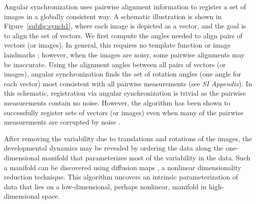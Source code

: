 \documentclass{pnastwo}
\begin{document}
\begin{article}
Angular synchronization uses pairwise alignment information to register a set of images in a globally consistent way.
%
A schematic illustration is shown in Figure~\ref{subfig:synch1}, where each image is depicted as a vector, and the goal is to align the set of vectors.
%
We first compute the angles needed to align pairs of vectors (or images).
%
In general, this requires no template function \cite{ahuja2007template} or image landmarks \cite{ian1998statistical};
however, when the images are noisy, some pairwise alignments may be inaccurate.
%
Using the alignment angles between all pairs of vectors (or images), angular synchronization finds the set of rotation angles (one angle for each vector) most consistent with all pairwise measurements (see {\it SI Appendix}).
%
In this schematic, registration via angular synchronization is trivial as the pairwise measurements contain no noise.
%
However, the algorithm has been shown to successfully register sets of vectors (or images) even when many of the pairwise measurements are corrupted by noise \cite{singer2011angular}.
%

%
After removing the variability due to translations and rotations of the images, the developmental dynamics may be revealed by ordering the data along the one-dimensional manifold that parameterizes most of the variability in the data.
%
Such a manifold can be discovered using diffusion maps \cite{coifman2005geometric}, a nonlinear dimensionality reduction technique.
%
This algorithm uncovers an intrinsic parameterization of data that lies on a low-dimensional, perhaps nonlinear, manifold in high-dimensional space.
%


\end{article}
\end{document}
